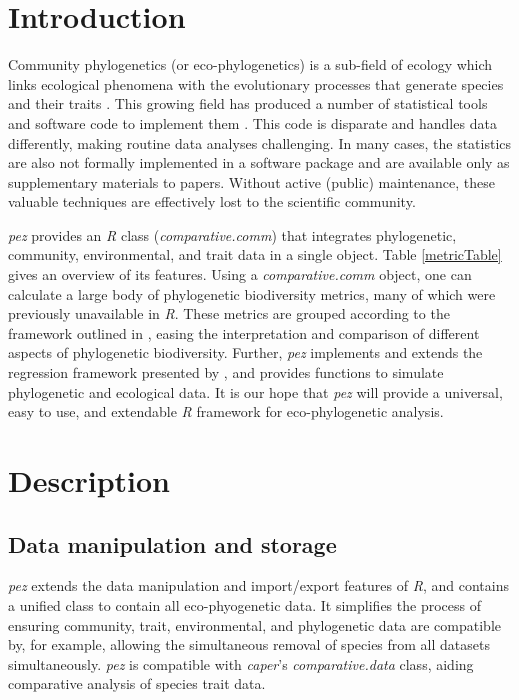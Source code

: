 \documentclass{bioinfo}
\begin{document}
\section{Introduction}
Community phylogenetics (or eco-phylogenetics) is a sub-field of
ecology which links ecological phenomena with the evolutionary
processes that generate species and their traits
\citep[see][]{Webb2002}. This growing field has produced a number of
statistical tools and software code to implement them
\citep[\emph{e.g.},][]{Kembel2010}. This code is disparate and handles
data differently, making routine data analyses challenging. In many
cases, the statistics are also not formally implemented in a software
package and are available only as supplementary materials to
papers. Without active (public) maintenance, these valuable techniques
are effectively lost to the scientific community.

\emph{pez} provides an \emph{R} \citep{R2014} class
(\emph{comparative.comm}) that integrates phylogenetic, community,
environmental, and trait data in a single object. Table
\ref{metricTable} gives an overview of its features. Using a
\emph{comparative.comm} object, one can calculate a large body of
phylogenetic biodiversity metrics, many of which were previously
unavailable in \emph{R}. These metrics are grouped according to the
framework outlined in \citet{Pearse2014review}, easing the
interpretation and comparison of different aspects of phylogenetic
biodiversity. Further, \emph{pez} implements and extends the
regression framework presented by \citep{Cavender-Bares2004}, and
provides functions to simulate phylogenetic and ecological data. It is
our hope that \emph{pez} will provide a universal, easy to use, and
extendable \emph{R} framework for eco-phylogenetic analysis.
\section{Description}
\subsection{Data manipulation and storage}
\emph{pez} extends the data manipulation and import/export features of
\emph{R}, and contains a unified class to contain all eco-phyogenetic
data. It simplifies the process of ensuring community, trait,
environmental, and phylogenetic data are compatible by, for example,
allowing the simultaneous removal of species from all datasets
simultaneously. \emph{pez} is compatible with \emph{caper}'s
\citep{Orme2013} \emph{comparative.data} class, aiding comparative
analysis of species trait data.
\end{document}
